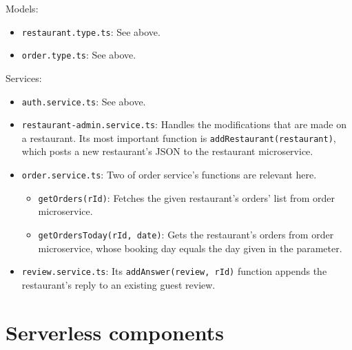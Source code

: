 Models:
\begin{itemize}
	\item \verb+restaurant.type.ts+: See above.
	\item \verb+order.type.ts+: See above.
\end{itemize}
Services:
\begin{itemize}
	\item \verb+auth.service.ts+: See above.
	\item \verb+restaurant-admin.service.ts+: Handles the modifications that are made on a restaurant. Its most important function is \verb+addRestaurant(restaurant)+, which posts a new restaurant's JSON to the restaurant microservice.
	\item \verb+order.service.ts+: Two of order service's functions are relevant here.
	\begin{itemize}
		\item\verb+getOrders(rId)+: Fetches the given restaurant's orders' list from order microservice.
		\item\verb+getOrdersToday(rId, date)+: Gets the restaurant's orders from order microservice, whose booking day equals the day given in the parameter.
	\end{itemize}
	\item \verb+review.service.ts+: Its \verb+addAnswer(review, rId)+ function appends the restaurant's reply to an existing guest review. 
\end{itemize}

\section{Serverless components}

